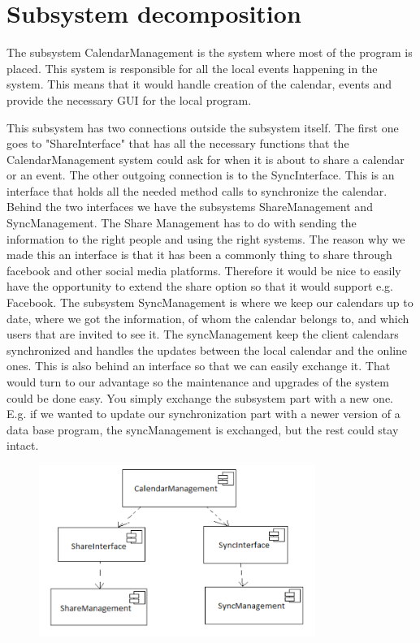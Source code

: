 \clearpage
\section*{Subsystem decomposition}
The subsystem CalendarManagement is the system where most of the program is placed. This system is responsible for all the local events happening in the system. This means that it would handle creation of the calendar, events and provide the necessary GUI for the local program. 

This subsystem has two connections outside the subsystem itself. The first one goes to "ShareInterface" that has all the necessary functions that the CalendarManagement system could ask for when it is about to share a calendar or an event. The other outgoing connection is to the SyncInterface. This is an interface that holds all the needed method calls to synchronize the calendar. Behind the two interfaces we have the subsystems ShareManagement and SyncManagement. 
\newline
\newline
The Share Management has to do with sending the information to the right people and using the right systems. The reason why we made this an interface is that it has been a commonly thing to share through facebook and other social media platforms. Therefore it would be nice to easily have the opportunity to extend the share option so that it would support e.g. Facebook. 
\newline
\newline
The subsystem SyncManagement is where we keep our calendars up to date, where we got the information, of whom the calendar belongs to, and which users that are invited to see it. The syncManagement keep the client calendars synchronized and handles the updates between the local calendar and the online ones. This is also behind an interface so that we can easily exchange it. That would turn to our advantage so the maintenance and upgrades of the system could be done easy. You simply exchange the subsystem part with a new one. E.g. if we wanted to update our synchronization part with a newer version of a data base program, the syncManagement is exchanged, but the rest could stay intact. 
\newline
\begin{figure}[ht!]
\centering
\includegraphics[width=90mm]{diagram.png}
\end{figure}


